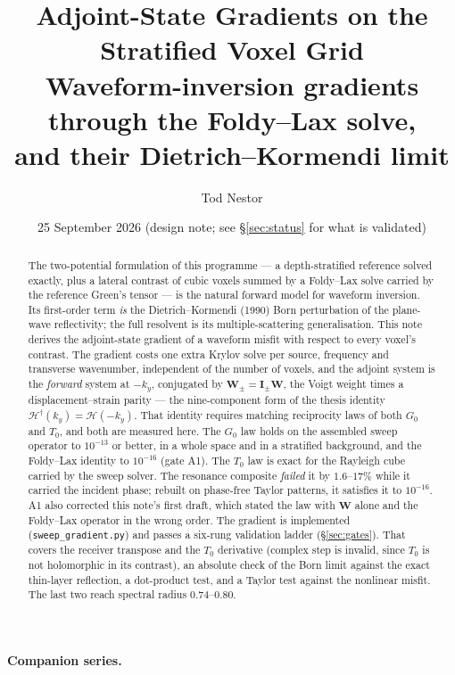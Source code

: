 \documentclass[11pt,a4paper]{article}
\title{Adjoint-State Gradients on the Stratified Voxel Grid\\[4pt]
\large Waveform-inversion gradients through the Foldy--Lax solve,\\
and their Dietrich--Kormendi limit}
\author{Tod Nestor}
\date{25 September 2026 \quad(design note; see \S\ref{sec:status} for what is validated)}
\newcommand{\Tz}{T_0}
\newcommand{\Gz}{G_0}
\newcommand{\bW}{\mathbf{W}}
\begin{document}
\maketitle

\begin{abstract}
\noindent
The two-potential formulation of this programme --- a depth-stratified reference solved exactly,
plus a lateral contrast of cubic voxels summed by a Foldy--Lax solve carried by the reference
Green's tensor --- is the natural forward model for waveform inversion. Its first-order term
\emph{is} the Dietrich--Kormendi (1990) Born perturbation of the plane-wave reflectivity; the full
resolvent is its multiple-scattering generalisation. This note derives the adjoint-state gradient
of a waveform misfit with respect to every voxel's contrast. The gradient costs one extra Krylov
solve per source, frequency and transverse wavenumber, independent of the number of voxels, and
the adjoint system is the \emph{forward} system at $-k_y$, conjugated by $\mathbf{W}_{\pm} = \mathbf{I}_{\pm}\bW$,
the Voigt weight times a displacement--strain parity --- the nine-component form of the thesis
identity $\mathcal{H}^\dagger(k_y) = \mathcal{H}(-k_y)$. That identity requires matching
reciprocity laws of both $\Gz$ and $\Tz$, and both are measured here. The $\Gz$ law holds on the
assembled sweep operator to $10^{-13}$ or better, in a whole space and in a stratified
background, and the Foldy--Lax identity to $10^{-16}$ (gate A1). The $\Tz$ law is exact for the
Rayleigh cube carried by the sweep solver. The resonance composite \emph{failed} it by
$1.6$--$17\%$ while it carried the incident phase; rebuilt on phase-free Taylor patterns, it
satisfies it to $10^{-16}$. A1 also corrected this note's first draft,
which stated the law with $\bW$ alone and the Foldy--Lax operator in the wrong order. The gradient
is implemented (\nolinkurl{sweep_gradient.py}) and passes a six-rung validation ladder
(\S\ref{sec:gates}). That covers the receiver transpose and the $\Tz$ derivative (complex step is
invalid, since $\Tz$ is not holomorphic in its contrast), an absolute check of the Born limit
against the exact thin-layer reflection, a dot-product test, and a Taylor test against the
nonlinear misfit. The last two reach spectral radius $0.74$--$0.80$.
\end{abstract}

\bigskip
\noindent\textbf{Companion series.}
\end{document}
